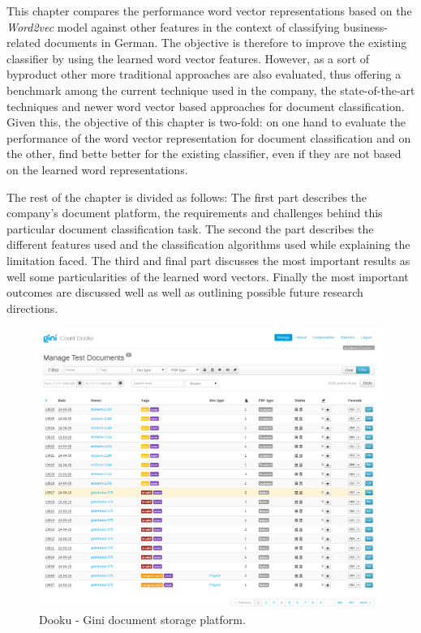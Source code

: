 This chapter compares the performance  word vector representations based on
the \textit{Word2vec} model  against other features  in the context of classifying
business-related documents in German. The objective is therefore to
improve the existing classifier by  using the learned word vector features.
However, as a  sort of byproduct other more 
traditional approaches  are also evaluated, thus offering a benchmark
among the current technique used in the company, the state-of-the-art techniques and
newer word vector based approaches for document classification. Given this,
the objective of this chapter is two-fold:  on one  hand  to evaluate the
performance  of the word vector representation for document classification
and on the other,  find bette better for the existing classifier, even if
they are not based on the learned word representations.

The rest of the chapter is divided as follows: The first part describes 
the company's  document platform, the requirements and challenges behind this
particular document classification task. The second the part describes the different features
used and the classification algorithms used while explaining the limitation
faced.  The third and final  part discusses the most important results as
well some particularities of the learned word vectors. Finally the most
important outcomes are discussed well as well as outlining possible future
research directions.

\begin{figure}[h]
    \centering
    \includegraphics[width=\textwidth]{images/001-dooku-screenshot.png}
    \caption{Dooku - Gini document storage platform.}
    \label{fig:dooku_screenshot}
\end{figure}

